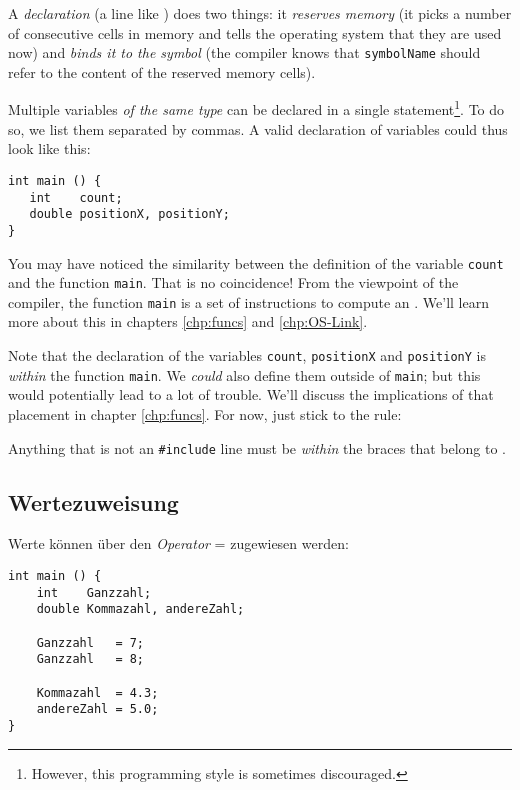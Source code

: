 A \emph{declaration} (\ie a line like ) does two things: it \emph{reserves memory} (\ie it picks a number of consecutive cells in memory and tells the operating system that they are used now) and \emph{binds it to the symbol} (\ie the compiler knows that \texttt{symbolName} should refer to the content of the reserved memory cells).

Multiple variables \emph{of the same type} can be declared in a single statement\footnote{However, this programming style is sometimes discouraged.}. To do so, we list them separated by commas. A valid declaration of variables could thus look like this:
\begin{codebox}
\begin{verbatim}
int main () {
   int    count;
   double positionX, positionY;
}
\end{verbatim}
\end{codebox}

You may have noticed the similarity between the definition of the variable \texttt{count} and the function \texttt{main}. That is no coincidence! From the viewpoint of the compiler, the function \texttt{main} is a set of instructions to compute an . We'll learn more about this in chapters \ref{chp:funcs} and \ref{chp:OS-Link}.

\begin{warnbox}
Note that the declaration of the variables \texttt{count}, \texttt{positionX} and \texttt{positionY} is \emph{within} the function \texttt{main}. We \emph{could} also define them outside of \texttt{main}; but this would potentially lead to a lot of trouble. We'll discuss the implications of that placement in chapter \ref{chp:funcs}. For now, just stick to the rule:

Anything that is not an \texttt{\#include} line must be \emph{within} the braces that belong to .
\end{warnbox}



\subsection{Wertezuweisung} \label{sec:valueAssignment}
Werte können über den \emph{Operator} = zugewiesen werden:
\begin{codebox}
\begin{verbatim}
int main () {
    int    Ganzzahl;
    double Kommazahl, andereZahl;

    Ganzzahl   = 7;
    Ganzzahl   = 8;

    Kommazahl  = 4.3;
    andereZahl = 5.0;
}
\end{verbatim}
\end{codebox}

